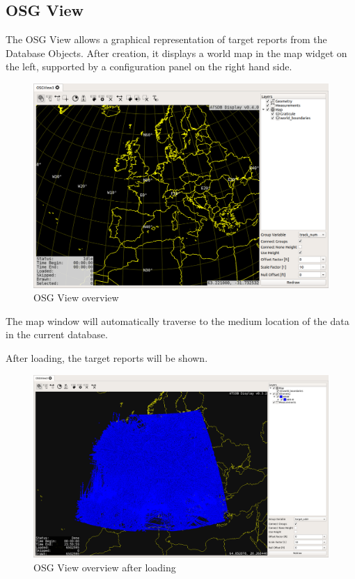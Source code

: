 \subsection{OSG View}
\label{sec:osgview}

The OSG View allows a graphical representation of target reports from the Database Objects. After creation, it displays a world map in the map widget on the left, supported by a configuration panel on the right hand side.

\begin{figure}[H]
    \hspace*{-2cm}
    \includegraphics[width=18cm,frame]{../screenshots/osgview_overview.png}
  \caption{OSG View overview}
  \label{fig:osgview_overview}
\end{figure}

The map window will automatically traverse to the medium location of the data in the current database.

After loading, the target reports will be shown.

\begin{figure}[H]
    \hspace*{-2cm}
    \includegraphics[width=18cm,frame]{../screenshots/osgview_overview_loaded.png}
  \caption{OSG View overview after loading}
\end{figure}

